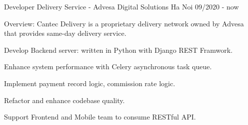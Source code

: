 \begin{cventries}
    \cventry
    {Developer} %
    {Delivery Service - Advesa Digital Solutions} %
    {Ha Noi} %
    {09/2020 - now} %
    {
        \begin{cvitems} %
            \item {Overview: Cantec Delivery is a proprietary delivery network owned by Advesa that provides same-day delivery service.}
            \item {Develop Backend server: written in Python with Django REST Framwork.}
            \item {Enhance system performance with Celery asynchronous task queue.}
            \item {Implement payment record logic, commission rate logic.}
            \item {Refactor and enhance codebase quality.}
            \item {Support Frontend and Mobile team to consume RESTful API.}
        \end{cvitems}
    }


\end{cventries}
